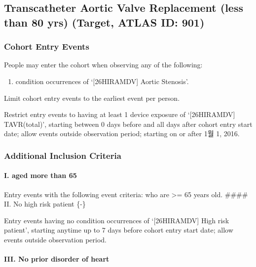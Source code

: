 \documentclass[
  12pt,
]{article}
\providecommand{\tightlist}{%
  \setlength{\itemsep}{0pt}\setlength{\parskip}{0pt}}
\begin{document}
\subsection{Transcatheter Aortic Valve Replacement (less than 80 yrs)
(Target, ATLAS ID:
901)}\label{transcatheter-aortic-valve-replacement-less-than-80-yrs-target-atlas-id-901}

\subsubsection{Cohort Entry Events}\label{cohort-entry-events-2}

People may enter the cohort when observing any of the following:

\begin{enumerate}
\def\labelenumi{\arabic{enumi}.}
\tightlist
\item
  condition occurrences of `{[}26HIRAMDV{]} Aortic Stenosis'.
\end{enumerate}

Limit cohort entry events to the earliest event per person.

Restrict entry events to having at least 1 device exposure of
`{[}26HIRAMDV{]} TAVR(total)', starting between 0 days before and all
days after cohort entry start date; allow events outside observation
period; starting on or after 1월 1, 2016.

\subsubsection{Additional Inclusion
Criteria}\label{additional-inclusion-criteria-2}

\paragraph*{I. aged more than 65}\label{i.-aged-more-than-65-1}

Entry events with the following event criteria: who are \textgreater= 65
years old. \#\#\#\# II. No high risk patient \{-\}

Entry events having no condition occurrences of `{[}26HIRAMDV{]} High
risk patient', starting anytime up to 7 days before cohort entry start
date; allow events outside observation period.

\paragraph*{III. No prior disorder of
heart}\label{iii.-no-prior-disorder-of-heart-1}
\end{document}
